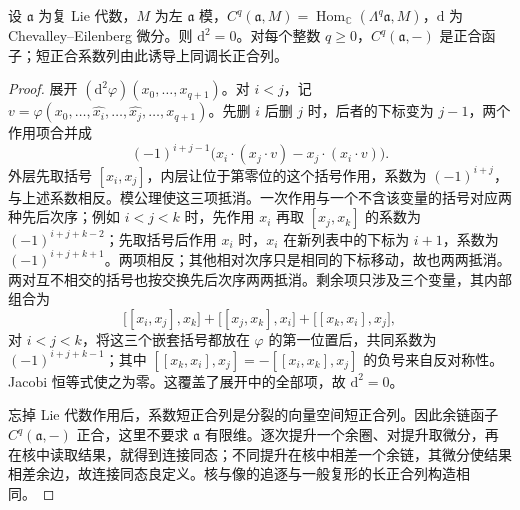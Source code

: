 \begin{proposition}\label{b5:prop:ce-differential}
	设 \(\mathfrak a\) 为复 Lie 代数，\(M\) 为左 \(\mathfrak a\) 模，\(C^q(\mathfrak a,M)=\operatorname{Hom}_{\mathbb C}(\Lambda^q\mathfrak a,M)\)，\(\mathrm{d}\) 为 Chevalley--Eilenberg 微分。则 \(\mathrm{d}^2=0\)。对每个整数 \(q\ge0\)，\(C^q(\mathfrak a,-)\) 是正合函子；短正合系数列由此诱导上同调长正合列。
\end{proposition}
\begin{proof}
	展开 \((\mathrm d^2\varphi)(x_0,\ldots,x_{q+1})\)。对 \(i<j\)，记 \(v=\varphi(x_0,\ldots,\widehat{x_i},\ldots,\widehat{x_j},\ldots,x_{q+1})\)。先删 \(i\) 后删 \(j\) 时，后者的下标变为 \(j-1\)，两个作用项合并成
	\[
		(-1)^{i+j-1}\bigl(x_i\cdot(x_j\cdot v)-x_j\cdot(x_i\cdot v)\bigr).
	\]
	外层先取括号 \([x_i,x_j]\)，内层让位于第零位的这个括号作用，系数为 \((-1)^{i+j}\)，与上述系数相反。模公理使这三项抵消。一次作用与一个不含该变量的括号对应两种先后次序；例如 \(i<j<k\) 时，先作用 \(x_i\) 再取 \([x_j,x_k]\) 的系数为 \((-1)^{i+j+k-2}\)；先取括号后作用 \(x_i\) 时，\(x_i\) 在新列表中的下标为 \(i+1\)，系数为 \((-1)^{i+j+k+1}\)。两项相反；其他相对次序只是相同的下标移动，故也两两抵消。两对互不相交的括号也按交换先后次序两两抵消。剩余项只涉及三个变量，其内部组合为
	\[
		\bigl[[x_i,x_j],x_k\bigr]+\bigl[[x_j,x_k],x_i\bigr]+\bigl[[x_k,x_i],x_j\bigr],
	\]
	对 \(i<j<k\)，将这三个嵌套括号都放在 \(\varphi\) 的第一位置后，共同系数为 \((-1)^{i+j+k-1}\)；其中 \([[x_k,x_i],x_j]=-[[x_i,x_k],x_j]\) 的负号来自反对称性。Jacobi 恒等式使之为零。这覆盖了展开中的全部项，故 \(\mathrm{d}^2=0\)。

	忘掉 Lie 代数作用后，系数短正合列是分裂的向量空间短正合列。因此余链函子 \(C^q(\mathfrak a,-)\) 正合，这里不要求 \(\mathfrak a\) 有限维。逐次提升一个余圈、对提升取微分，再在核中读取结果，就得到连接同态；不同提升在核中相差一个余链，其微分使结果相差余边，故连接同态良定义。核与像的追逐与一般复形的长正合列构造相同。
\end{proof}

